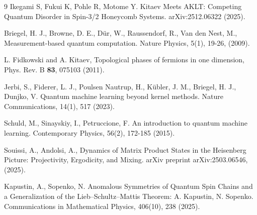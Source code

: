 \documentclass[12pt,a4paper]{article}
\begin{document}
\begin{thebibliography}{9}
Ikegami S, Fukui K, Pohle R, Motome Y. Kitaev Meets AKLT: Competing Quantum Disorder in Spin-3/2 Honeycomb Systems. arXiv:2512.06322   (2025).

 Briegel, H. J., Browne, D. E., Dür, W., Raussendorf, R.,   Van den Nest, M., Measurement-based quantum computation. Nature Physics, 5(1), 19-26, (2009).



 L. Fidkowski and A. Kitaev,  Topological phases of fermions in one dimension, Phys. Rev. B \textbf{83}, 075103 (2011).




 Jerbi, S., Fiderer, L. J., Poulsen Nautrup, H., Kübler, J. M., Briegel, H. J.,   Dunjko, V. Quantum machine learning beyond kernel methods. Nature Communications, 14(1), 517  (2023).








  Schuld, M., Sinayskiy, I.,  Petruccione, F.  An introduction to quantum machine learning. Contemporary Physics, 56(2), 172-185 (2015).







 Souissi, A.,   Andolsi, A.,  Dynamics of Matrix Product States in the Heisenberg Picture: Projectivity, Ergodicity, and Mixing. arXiv preprint arXiv:2503.06546, (2025).




  Kapustin, A.,  Sopenko, N.  Anomalous Symmetries of Quantum Spin Chains and a Generalization of the Lieb–Schultz–Mattis Theorem: A. Kapustin, N. Sopenko. Communications in Mathematical Physics, 406(10), 238 (2025).



\end{thebibliography}
\end{document}
